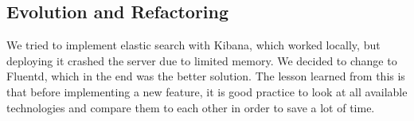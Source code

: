\subsection{Evolution and Refactoring}

We tried to implement elastic search with Kibana, which worked locally, but deploying it crashed the server due to limited memory.
We decided to change to Fluentd, which in the end was the better solution.
The lesson learned from this is that before implementing a new feature, it is good practice to look at all available technologies and compare them to each other in order to save a lot of time.

